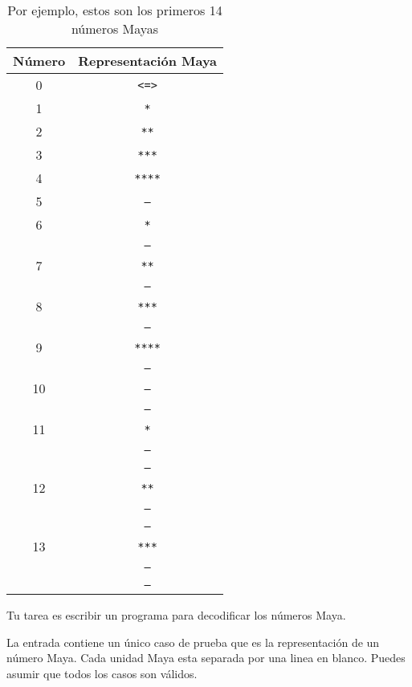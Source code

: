 \begin{table}[ht]
\centering
\begin{tabular}{|c|c|}
    \hline
    \textbf{Número} & \textbf{Representación Maya} \\
    \hline
    0 & \texttt{<=>} \\
    \hline
    1 & \texttt{*} \\
    \hline
    2 & \texttt{**} \\
    \hline
    3 & \texttt{***} \\
    \hline
    4 & \texttt{****} \\
    \hline
    5 & \texttt{---} \\
    \hline
    6 & \texttt{*} \\
      & \texttt{---} \\
    \hline
    7 & \texttt{**} \\
      & \texttt{---} \\
    \hline
    8 & \texttt{***} \\
      & \texttt{---} \\
    \hline
    9 & \texttt{****} \\
      & \texttt{---} \\
    \hline
    10 & \texttt{---} \\
       & \texttt{---} \\
    \hline
    11 & \texttt{*} \\
       & \texttt{---} \\
       & \texttt{---} \\
    \hline
    12 & \texttt{**} \\
       & \texttt{---} \\
       & \texttt{---} \\
    \hline
    13 & \texttt{***} \\
       & \texttt{---} \\
       & \texttt{---} \\
    \hline
\end{tabular}
\captionsetup{labelformat=empty}
\caption{Por ejemplo, estos son los primeros 14 n\'umeros Mayas}
\end{table}

Tu tarea es escribir un programa para decodificar los n\'umeros Maya.


La entrada contiene un \'unico caso de prueba que es la representaci\'on de un n\'umero Maya. Cada unidad Maya esta separada por una linea en blanco. Puedes asumir que todos los casos son v\'alidos.

